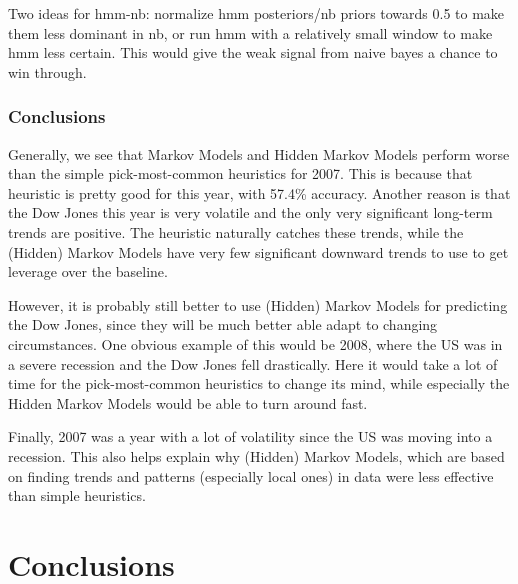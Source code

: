 \documentclass[10pt, twocolumn]{article}
\begin{document}
Two ideas for hmm-nb: normalize hmm posteriors/nb priors towards 0.5 to make them less dominant in nb, or run hmm with a relatively small window to make hmm less certain. This would give the weak signal from naive bayes a chance to win through.


\subsubsection{Conclusions}

Generally, we see that Markov Models and Hidden Markov Models perform worse than the simple pick-most-common heuristics for 2007. This is because that heuristic is pretty good for this year, with 57.4\% accuracy. Another reason is that the Dow Jones this year is very volatile and the only very significant long-term trends are positive. The heuristic naturally catches these trends, while the (Hidden) Markov Models have very few significant downward trends to use to get leverage over the baseline.

However, it is probably still better to use (Hidden) Markov Models for predicting the Dow Jones, since they will be much better able adapt to changing circumstances.
One obvious example of this would be 2008, where the US was in a severe recession and the Dow Jones fell drastically.
Here it would take a lot of time for the pick-most-common heuristics to change its mind, while especially the Hidden Markov Models would be able to turn around fast.

Finally, 2007 was a year with a lot of volatility since the US was moving into a recession.
This also helps explain why (Hidden) Markov Models, which are based on finding trends and patterns (especially local ones) in data were less effective than simple heuristics.



\section{Conclusions}



\end{document}
